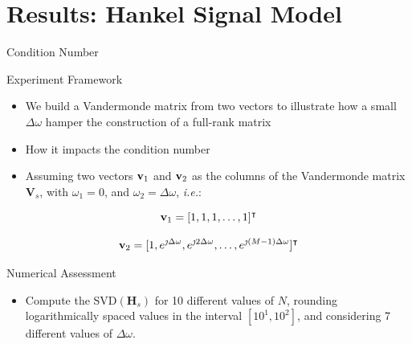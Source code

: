 \documentclass{beamer}
\begin{document}
	
\section{Results: Hankel Signal Model }
	
	\begin{frame}{Condition Number}

	    \begin{block}{Experiment Framework}
        	\begin{itemize}
        	    \item We build a Vandermonde matrix from two vectors to illustrate how a small $\Delta \omega$ hamper the construction of a full-rank matrix
        	    \item How it impacts the condition number
        	\end{itemize}
		\end{block}

        \begin{itemize}
            \item Assuming two vectors ${\bf{v}}_1$ and ${\bf{v}}_2$ as the columns of the Vandermonde matrix ${\mathbf{V}}_s$, with $\omega_1 = 0$, and $\omega_2 = \Delta \omega$, \textit{i.e.}:
        \end{itemize}
		
		\vspace{-10pt}

		$$ {\bf{v}}_1=[1, 1, 1, \dots, 1]^\intercal $$
		
		\vspace{-10pt}
		
		$$ {\bf{v}}_2 = [1, e^{\jmath\Delta\omega}, e^{\jmath2\Delta\omega}, \dots, e^{\jmath(M-1)\Delta\omega}]^\intercal $$
		
		\begin{block}{Numerical Assessment}
		    \begin{itemize}
			    \item Compute the SVD$({\mathbf{H}}_s)$ for 10 different values of $N$, rounding logarithmically spaced values in the interval $[10^{1},10^{2}]$, and considering 7 different values of $\Delta \omega$.
		\end{itemize}
		\end{block}

	\end{frame}
\end{document}
